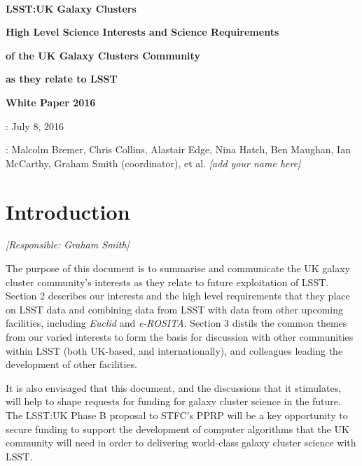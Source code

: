 \documentclass[a4paper,11pt]{article}
\begin{document}
\pagestyle{myheadings}

\sloppy

\pagestyle{empty}

~\vspace{70mm}

\centerline{\LARGE\bf LSST:UK Galaxy Clusters}
\bigskip\bigskip\bigskip
\centerline{\Large\bf High Level Science Interests and Science Requirements}
\medskip
\centerline{\Large\bf of the UK Galaxy Clusters Community}
\medskip
\centerline{\Large\bf as they relate to LSST}
\bigskip\bigskip\bigskip
\centerline{\Large\bf White Paper 2016}

\vspace{90mm}

\large
{}: July 8, 2016

: Malcolm Bremer, Chris Collins, Alastair
Edge, Nina Hatch, Ben Maughan, Ian McCarthy, Graham Smith (coordinator), et al. {\it
  [add your name here]}


\newpage
\pagestyle{myheadings}
\setlength{\topmargin}{-10mm}
\setlength{\textheight}{255mm}

\tableofcontents

\newpage

\section{Introduction}\label{sec:intro}

{\it [Responsible: Graham Smith]}

\noindent
The purpose of this document is to summarise and communicate the UK
galaxy cluster community's interests as they relate to future
exploitation of LSST.  Section 2 describes our interests and the high
level requirements that they place on LSST data and combining data
from LSST with data from other upcoming facilities, including
\emph{Euclid} and \emph{e-ROSITA}.  Section 3 distils the common
themes from our varied interests to form the basis for discussion with
other communities within LSST (both UK-based, and internationally),
and colleagues leading the development of other facilities.

It is also envisaged that this document, and the discussions that it
stimulates, will help to shape requests for funding for galaxy cluster
science in the future.  The LSST:UK Phase B proposal to STFC's PPRP
will be a key opportunity to secure funding to support the development
of computer algorithms that the UK community will need in order to
delivering world-class galaxy cluster science with LSST.
\end{document}
